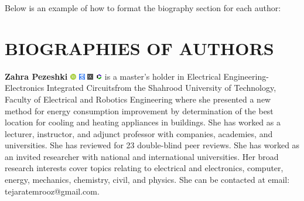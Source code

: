 \documentclass{iaesarticle}
\begin{document}
\noindent Below is an example of how to format the biography section for each author:

\section*{BIOGRAPHIES OF AUTHORS}
\vspace{-.7em} 
\small
\begin{biography}
\textbf{Zahra Pezeshki} %
\href{https://orcid.org/0000-0003-3366-3647}{\includegraphics[width=0.02\textwidth]{orcid.png}} 
\href{https://scholar.google.com/citations?user=XKJhK78AAAAJ&hl=en}{\includegraphics[width=0.02\textwidth]{gscholar.png}}
\href{https://www.scopus.com/authid/detail.uri?authorId=57191962990}{\includegraphics[width=0.02\textwidth]{scopus.png}}
\href{https://www.webofscience.com/wos/author/rid/E-1666-2017/}{\includegraphics[width=0.02\textwidth]{wos.png}} is a master's holder in Electrical Engineering-Electronics Integrated Circuitsfrom the Shahrood University of Technology, Faculty of Electrical and Robotics Engineering where she presented a new method for energy consumption improvement by determination of the best location for cooling and heating appliances in buildings. She has worked as a lecturer, instructor, and adjunct professor with companies, academies, and universities. She has reviewed for 23 double-blind peer reviews. She has worked as an invited researcher with national and international universities. Her broad research interests cover topics relating to electrical and electronics, computer, energy, mechanics, chemistry, civil, and physics. She can be contacted at email: tejaratemrooz@gmail.com.
\end{biography}
\end{document}

